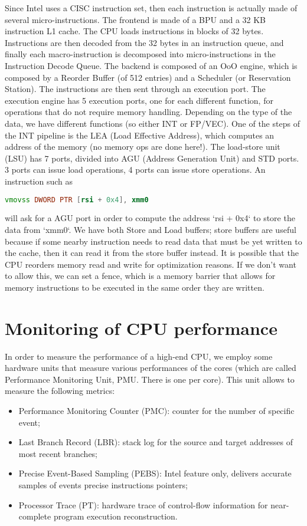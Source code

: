 Since Intel uses a CISC instruction set, then each instruction is actually made of several micro-instructions.
\nwl
The frontend is made of a BPU and a 32 KB instruction L1 cache. The CPU loads instructions in blocks of 32 bytes. Instructions are then decoded from the 32 bytes in an instruction queue, and finally each macro-instruction is decomposed into micro-instructions in the Instruction Decode Queue.
\nwl
The backend is composed of an OoO engine, which is composed by a Reorder Buffer (of 512 entries) and a Scheduler (or Reservation Station). The instructions are then sent through an execution port.
\nwl
The execution engine has 5 execution ports, one for each different function, for operations that do not require memory handling. Depending on the type of the data, we have different functions (so either INT or FP/VEC). One of the steps of the INT pipeline is the LEA (Load Effective Address), which computes an address of the memory (no memory ops are done here!).
\nwl
The load-store unit (LSU) has 7 ports, divided into AGU (Address Generation Unit) and STD ports. 3 ports can issue load operations, 4 ports can issue store operations. An instruction such as

\begin{lstlisting}[language = asm]
    vmovss DWORD PTR [rsi + 0x4], xmm0
\end{lstlisting}

will ask for a AGU port in order to compute the address `rsi + 0x4` to store the data from `xmm0`. We have both Store and Load buffers; store buffers are useful because if some nearby instruction needs to read data that must be yet written to the cache, then it can read it from the store buffer instead.
\nwl
It is possible that the CPU reorders memory read and write for optimization reasons. If we don't want to allow this, we can set a fence, which is a memory barrier that allows for memory instructions to be executed in the same order they are written.

\section{Monitoring of CPU performance}

In order to measure the performance of a high-end CPU, we employ some hardware units that measure various performances of the cores (which are called Performance Monitoring Unit, PMU. There is one per core). This unit allows to measure the following metrics:
\begin{itemize}
    \item Performance Monitoring Counter (PMC): counter for the number of specific event;
    \item Last Branch Record (LBR): stack log for the source and target addresses of most recent branches;
    \item Precise Event-Based Sampling (PEBS): Intel feature only, delivers accurate samples of events precise instructions pointers;
    \item Processor Trace (PT): hardware trace of control-flow information for near-complete program execution reconstruction.
\end{itemize}

